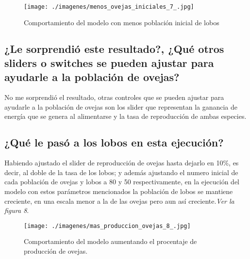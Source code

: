 \documentclass[12pt,letterpaper]{article}
\begin{document}
\begin{figure}[h!]
\begin{floatrow}
\centering
\caption{Comportamiento del modelo con menos población inicial de lobos}
\texttt{[image: ./imagenes/menos\_ovejas\_iniciales\_7\_.jpg]}
\label{fig: vista}
\end{floatrow}
\end{figure}

\subsection{¿Le sorprendió este resultado?, ¿Qué otros sliders o switches se pueden ajustar para ayudarle a la población de ovejas?}

No me sorprendió el resultado, otras controles que se pueden ajustar para ayudarle a la población de ovejas son los slider que representan la ganancia de energía que se genera al alimentarse y la tasa de reproducción de ambas especies.

\subsection{¿Qué le pasó a los lobos en esta ejecución?}
Habiendo ajustado el slider de reproducción de ovejas hasta dejarlo en 10\%, es decir, al doble de la tasa de los lobos; y además ajustando el numero inicial de cada población de ovejas y lobos a 80 y 50  respectivamente, en la ejecución del modelo con estos parámetros mencionados la población de lobos se mantiene creciente, en una escala menor a la de las ovejas pero aun así creciente.\textit{Ver la figura 8}.

\begin{figure}[h!]
\begin{floatrow}
\centering
\caption{Comportamiento del modelo aumentando el procentaje de producción de ovejas.}
\texttt{[image: ./imagenes/mas\_produccion\_ovejas\_8\_.jpg]}
\label{fig: vista}
\end{floatrow}
\end{figure}

\vspace{1cm}
\end{document}
